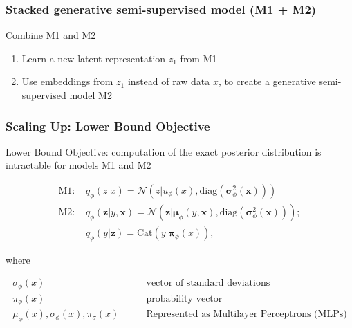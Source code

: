\documentclass{beamer}
\begin{document}
\begin{frame}
  \frametitle{Stacked generative semi-supervised model (M1 + M2)}

  Combine M1 and M2
  \begin{enumerate}
  \item Learn a new latent representation $z_1$ from M1
  \item Use embeddings from $z_1$ instead of raw data $x$, to create
    a generative semi-supervised model M2
  \end{enumerate}

  \begin{center}
  \end{center}

  

\end{frame}

\begin{frame}
  \frametitle{Scaling Up: Lower Bound Objective}

  Lower Bound Objective\footnotemark: computation of the exact posterior
  distribution is intractable for models M1 and M2
  
  \begin{align*}
    \text{M1: } &q_\phi (z|x) = \mathcal{N}(z|u_\phi (x),
    \text{diag}(\mathbf{\sigma}_\phi^2 (\mathbf{x}))) \tag{3}\\
    \text{M2: } &q_\phi(\mathbf{z}|y,\mathbf{x}) =
    \mathcal{N}(\mathbf{z}|\mathbf{\mu}_\phi (y, \mathbf{x}),
    \text{diag}(\mathbf{\sigma}_\phi^2(\mathbf{x}))); \\
    &q_\phi (y|\mathbf{z}) = \text{Cat}(y|\mathbf{\pi}_\phi (x)), \tag{4}
  \end{align*}

  where

  \begin{align*}
    \sigma_\phi (x) &\qquad \text{vector of standard deviations} \\
    \pi_\phi(x) &\qquad \text{probability vector} \\
    \mu_\phi(x), \sigma_\phi(x), \pi_\sigma (x)  &\qquad
    \text{Represented as Multilayer Perceptrons (MLPs)} \\
    \end{align*}

\end{frame}
\end{document}
